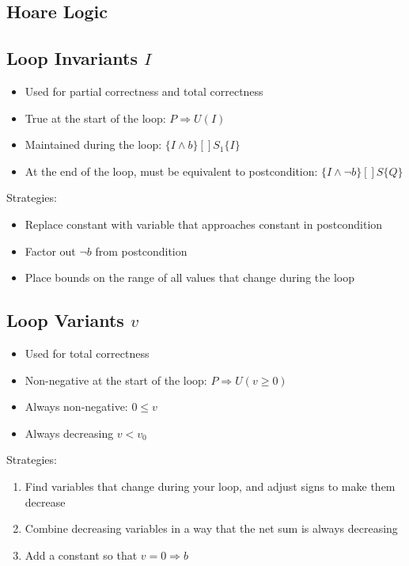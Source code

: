 \documentclass[landscape]{cheat}
\begin{document}
\begin{multicols*}{3}
\section{Hoare Logic}

\subsection{Loop Invariants $I$}
\begin{itemize}
    \item Used for partial correctness and total correctness
    \item True at the start of the loop: $P \Rightarrow U(I)$
    \item Maintained during the loop: $\{I \land b\}[]S_1\{I\}$
    \item At the end of the loop, must be equivalent to postcondition: $\{I \land \lnot b \}[]S\{Q\}$
\end{itemize}
Strategies:
\begin{itemize}
    \item Replace constant with variable that approaches constant in postcondition 
    \item Factor out $\lnot b$ from postcondition
    \item Place bounds on the range of all values that change during the loop
\end{itemize}

\subsection{Loop Variants $v$}
\begin{itemize}
    \item Used for total correctness
    \item Non-negative at the start of the loop: $P \Rightarrow U(v \geq 0)$
    \item Always non-negative: $0 \leq v$
    \item Always decreasing $v < v_0$
\end{itemize}
Strategies:
\begin{enumerate}
    \item Find variables that change during your loop, and adjust signs to make them decrease
    \item Combine decreasing variables in a way that the net sum is always decreasing
    \item Add a constant so that $v = 0 \Rightarrow b$
\end{enumerate}


\end{multicols*}
\end{document}
